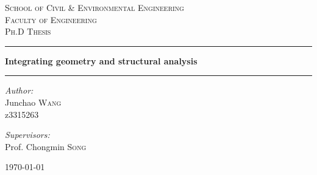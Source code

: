 \documentclass[a4paper,12pt]{book}
\begin{document}

\begin{titlepage}
    \begin{center}
    \textsc{\large  School of Civil \& Environmental Engineering}\\[0.5cm]
    \textsc{\large  Faculty of Engineering}\\[0.5cm]
    \textsc{\large  Ph.D Thesis}\\[0.5cm]
     \hrule 
    \vspace{0.1in}
    { \huge \bfseries Integrating geometry and structural analysis}\\[0.4cm]
    \hrule
    
    \begin{figure}
    \centering
    \end{figure}
    \vspace{0.1in}
    \begin{minipage}{0.4\textwidth}
    \begin{flushleft} \large
    \emph{Author:}\\
    Junchao \textsc{Wang}\\
    z3315263
    \end{flushleft}
    \end{minipage}
    \begin{minipage}{0.4\textwidth}
    \begin{flushright} \large
    \vspace{0.2in}
    \emph{Supervisors:} \\
    Prof. Chongmin \textsc{Song}\\
    \end{flushright}
    \end{minipage}
    
    \vfill
    {\large \today}
    \end{center}
\end{titlepage}
\tableofcontents
\end{document}
